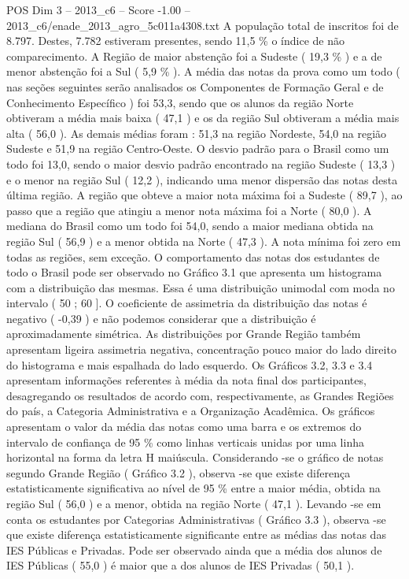 \begin{textsample}{POS Dim 3 – 2013\_c6 – Score -1.00 – 2013\_c6/enade\_2013\_agro\_5c011a4308.txt}
A população total de inscritos foi de 8.797.
Destes, 7.782 estiveram presentes, sendo 11,5 \% o índice de não comparecimento.
A Região de maior abstenção foi a Sudeste ( 19,3 \% ) e a de menor abstenção foi a Sul ( 5,9 \% ).
A média das notas da prova como um todo ( nas seções seguintes serão analisados os Componentes de Formação Geral e de Conhecimento Específico ) foi 53,3, sendo que os alunos da região Norte obtiveram a média mais baixa ( 47,1 ) e os da região Sul obtiveram a média mais alta ( 56,0 ).
As demais médias foram : 51,3 na região Nordeste, 54,0 na região Sudeste e 51,9 na região Centro-Oeste.
O desvio padrão para o Brasil como um todo foi 13,0, sendo o maior desvio padrão encontrado na região Sudeste ( 13,3 ) e o menor na região Sul ( 12,2 ), indicando uma menor dispersão das notas desta última região.
A região que obteve a maior nota máxima foi a Sudeste ( 89,7 ), ao passo que a região que atingiu a menor nota máxima foi a Norte ( 80,0 ).
A mediana do Brasil como um todo foi 54,0, sendo a maior mediana obtida na região Sul ( 56,9 ) e a menor obtida na Norte ( 47,3 ).
A nota mínima foi zero em todas as regiões, sem exceção.
O comportamento das notas dos estudantes de todo o Brasil pode ser observado no Gráfico 3.1 que apresenta um histograma com a distribuição das mesmas.
Essa é uma distribuição unimodal com moda no intervalo ( 50 ; 60 ].
O coeficiente de assimetria da distribuição das notas é negativo ( -0,39 ) e não podemos considerar que a distribuição é aproximadamente simétrica.
As distribuições por Grande Região também apresentam ligeira assimetria negativa, concentração pouco maior do lado direito do histograma e mais espalhada do lado esquerdo.
Os Gráficos 3.2, 3.3 e 3.4 apresentam informações referentes à média da nota final dos participantes, desagregando os resultados de acordo com, respectivamente, as Grandes Regiões do país, a Categoria Administrativa e a Organização Acadêmica.
Os gráficos apresentam o valor da média das notas como uma barra e os extremos do intervalo de confiança de 95 \% como linhas verticais unidas por uma linha horizontal na forma da letra H maiúscula.
Considerando -se o gráfico de notas segundo Grande Região ( Gráfico 3.2 ), observa -se que existe diferença estatisticamente significativa ao nível de 95 \% entre a maior média, obtida na região Sul ( 56,0 ) e a menor, obtida na região Norte ( 47,1 ).
Levando -se em conta os estudantes por Categorias Administrativas ( Gráfico 3.3 ), observa -se que existe diferença estatisticamente significante entre as médias das notas das IES Públicas e Privadas.
Pode ser observado ainda que a média dos alunos de IES Públicas ( 55,0 ) é maior que a dos alunos de IES Privadas ( 50,1 ).

\end{textsample}

